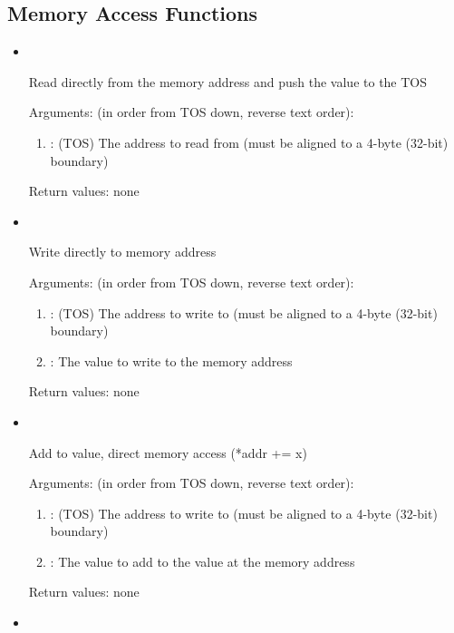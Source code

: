 \subsection{Memory Access Functions}
\begin{itemize}
\item {}\ 

\noindent Read directly from the memory address and push the value to the TOS

\noindent Arguments: (in order from TOS down, reverse text order):
\begin{enumerate}
\item {}: (TOS) The address to read from (must be aligned to a 4-byte (32-bit) boundary)
\end{enumerate}

\noindent Return values: none

\item \forthinlinehl{!}\ 

\noindent Write directly to memory address

\noindent Arguments: (in order from TOS down, reverse text order):
\begin{enumerate}
\item {}: (TOS) The address to write to (must be aligned to a 4-byte (32-bit) boundary)
\item {}: The value to write to the memory address
\end{enumerate}

\noindent Return values: none

\item \forthinlinehl{+!}\ 

\noindent Add to value, direct memory access (*addr += x)

\noindent Arguments: (in order from TOS down, reverse text order):
\begin{enumerate}
\item {}: (TOS) The address to write to (must be aligned to a 4-byte (32-bit) boundary)
\item {}: The value to add to the value at the memory address
\end{enumerate}

\noindent Return values: none

\item {}\ 


\end{itemize}
